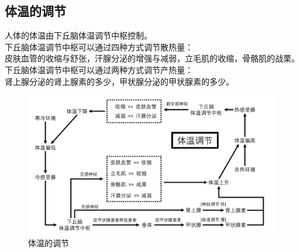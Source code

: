 \documentclass[UTF8]{ctexart}
\begin{document}
\newpage

\subsection{体温的调节}
    人体的体温由下丘脑体温调节中枢控制。\\[3mm]
    下丘脑体温调节中枢可以通过四种方式调节散热量：\\[3mm]
    皮肤血管的收缩与舒张，汗腺分泌的增强与减弱，立毛肌的收缩，骨骼肌的战栗。\\[3mm]
    下丘脑体温调节中枢可以通过两种方式调节产热量：\\[3mm]
    肾上腺分泌的肾上腺素的多少，甲状腺分泌的甲状腺素的多少。\vspace{10pt}
    \begin{figure}[h]
        \begin{center}
            \includegraphics[width=14cm]{BiologyImage/54.jpg}
        \end{center}
        \caption{体温的调节}
    \end{figure}

\newpage
\end{document}
